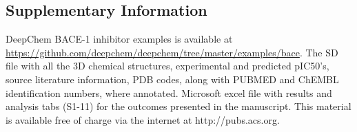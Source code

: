 \subsection{Supplementary Information}

DeepChem BACE-1 inhibitor examples is available at \url{https://github.com/deepchem/deepchem/tree/master/examples/bace}. 
The SD file with all the 3D chemical structures, experimental and predicted pIC50’s, source literature information, PDB codes, along with PUBMED and ChEMBL identification numbers, where annotated. Microsoft excel file with results and analysis tabs (S1-11) for the outcomes presented in the manuscript.  This material is available free of charge via the internet at http://pubs.acs.org.





